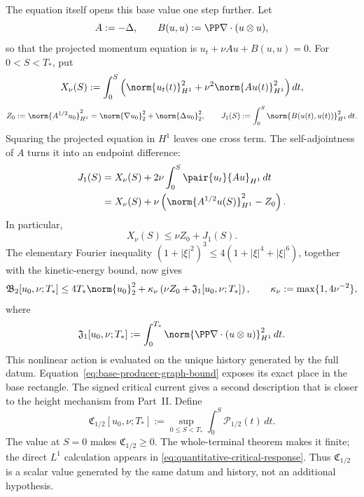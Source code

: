 The equation itself opens this base value one step further.  Let
\[
 A:=-\Delta,
 \qquad
 B(u,u):=\PP\nabla\cdot(u\otimes u),
\]
so that the projected momentum equation is
\(u_t+\nu Au+B(u,u)=0\).  For \(0<S<T_*\), put
\[
 X_\nu(S)
 :=\int_0^S\left(
   \norm{u_t(t)}_{H^1}^2
   +\nu^2\norm{Au(t)}_{H^1}^2
  \right)dt,
\]
\[
 Z_0
 :=\norm{A^{1/2}u_0}_{H^1}^2
 =\norm{\nabla u_0}_2^2+\norm{\Delta u_0}_2^2,
 \qquad
 J_1(S)
 :=\int_0^S\norm{B(u(t),u(t))}_{H^1}^2\,dt.
\]
Squaring the projected equation in \(H^1\) leaves one cross term.  The
self-adjointness of \(A\) turns it into an endpoint difference:
\begin{align}
 J_1(S)
 &=X_\nu(S)+2\nu\int_0^S\pair{u_t}{Au}_{H^1}\,dt
 \notag\\
 &=X_\nu(S)
   +\nu\left(
    \norm{A^{1/2}u(S)}_{H^1}^2-Z_0
   \right).
 \label{eq:base-graph-identity}
\end{align}
In particular,
\begin{equation}
 X_\nu(S)\le\nu Z_0+J_1(S).
 \label{eq:base-graph-upper-bound}
\end{equation}
The elementary Fourier inequality
\((1+|\xi|^2)^3\le
4(1+|\xi|^4+|\xi|^6)\), together with the kinetic-energy bound, now gives
\begin{equation}
 \mathfrak B_2[u_0,\nu;T_*]
 \le4T_*\norm{u_0}_2^2
 +\kappa_\nu\left(
   \nu Z_0+\mathfrak J_1[u_0,\nu;T_*]
  \right),
 \qquad
 \kappa_\nu:=\max\{1,4\nu^{-2}\},
 \label{eq:base-producer-graph-bound}
\end{equation}
where
\[
 \mathfrak J_1[u_0,\nu;T_*]
 :=\int_0^{T_*}\norm{\PP\nabla\cdot(u\otimes u)}_{H^1}^2\,dt.
\]
This nonlinear action is evaluated on the unique history generated by the
full datum.  Equation~\eqref{eq:base-producer-graph-bound} exposes its exact
place in the base rectangle.  The signed critical current gives a second
description that is closer to the height mechanism from Part~II.  Define
\begin{equation}
 \mathfrak C_{1/2}[u_0,\nu;T_*]
 :=\sup_{0\le S<T_*}\int_0^S\mathcal P_{1/2}(t)\,dt.
 \label{eq:critical-prefix-value}
\end{equation}
The value at \(S=0\) makes \(\mathfrak C_{1/2}\ge0\).  The whole-terminal
theorem makes it finite; the direct \(L^1\) calculation appears in
\eqref{eq:quantitative-critical-response}.  Thus
\(\mathfrak C_{1/2}\) is a scalar value generated by the same datum and
history, not an additional hypothesis.

